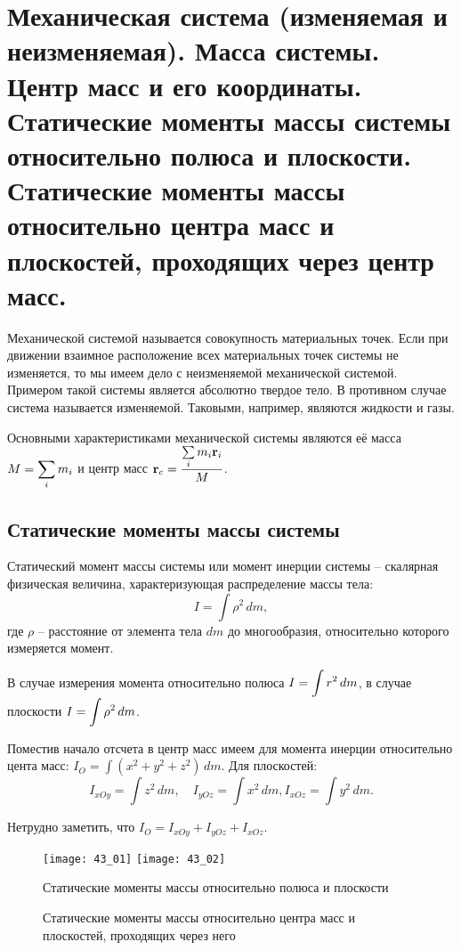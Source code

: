 \chapter{Механическая система (изменяемая и неизменяемая). Масса системы. Центр
масс и его координаты. Статические моменты массы системы относительно
полюса и плоскости. Статические моменты массы относительно центра масс и
плоскостей, проходящих через центр масс.}

Механической системой называется совокупность материальных точек. Если при
движении взаимное расположение всех материальных точек системы не изменяется, то
мы имеем дело с неизменяемой механической системой. Примером такой системы
является абсолютно твердое тело. В противном случае система называется
изменяемой. Таковыми, например, являются жидкости и газы.

Основными характеристиками механической системы являются её масса
\( \displaystyle M = \sum_i m_i \) и центр масс \( \displaystyle \boldsymbol{\mathrm{r}}_c =
\frac{\sum\limits_i m_i\boldsymbol{\mathrm{r}}_i}{M} \).

\section{Статические моменты массы системы}
Статический момент массы системы или момент инерции системы -- скалярная
физическая величина, характеризующая распределение массы тела:
\[
    I = \int \rho^2\,dm,
\]
где \( \rho \) -- расстояние от элемента тела \( dm \) до многообразия,
относительно которого измеряется момент.

В случае измерения момента относительно полюса \( \displaystyle I = \int r^2\,dm \), в случае
плоскости \( \displaystyle I = \int \rho^2\,dm \).

Поместив начало отсчета в центр масс имеем для момента инерции относительно
цента масс: \( I_O = \int (x^2 + y^2 + z^2)\,dm \). Для плоскостей:
\[
    I_{xOy} = \int z^2\,dm, \quad I_{yOz} = \int x^2\,dm,
    I_{xOz} = \int y^2\,dm.
\]

Нетрудно заметить, что \( I_O = I_{xOy} + I_{yOz} + I_{xOz} \).

\begin{figure}[h!]
    \texttt{[image: 43\_01]} \hfill
    \texttt{[image: 43\_02]}
    \parbox{.47\textwidth}{\caption{Статические моменты массы относительно
    полюса и плоскости}} \hfill
    \parbox{.47\textwidth}{\caption{Статические моменты массы относительно
    центра масс и плоскостей, проходящих через него}}
\end{figure}

\newpage %
